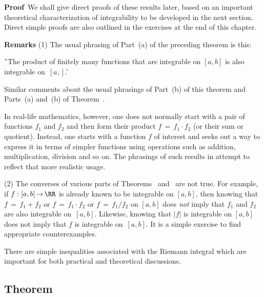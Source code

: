 \V


        {\bf Proof}\, We shall give direct proofs of these results later, based on an important theoretical characterization of integrability to be developed in the next section.
    Direct simple proofs are also outlined in the exercises at the end of this chapter. \Q %

\V

        {\bf Remarks} (1) The usual phrasing of Part~(a) of the preceding theorem is this:

\VA

        \h `The product of finitely many functions that are integrable on $[a,b]$ is also integrable on~$[a,]$.'

\VA

\noindent Similar comments about the usual phrasings of Part~(b) of this theorem and Parts~(a) and~(b) of Theorem~.

        In real-life mathematics, however, one does not normally start with a pair of functions $f_{1}$ and $f_{2}$ and then form their product $f \,=\, f_{1}{\cdot}f_{2}$ (or their sum or quotient).
    Instead, one starts with a function $f$ of interest and seeks out a way to express it in terms of simpler functions using operations such as addition,
    multiplication, division and so on. The phrasings of such results in {\ThisText} attempt to reflect that more realistic usage.

\V

        (2) The converses of various parts of Theorems~ and~ are not true.
    For example, if $f:[a,b] \,{\rightarrow}\, {\RR}$ is already known to be integrable on $[a,b]$, then knowing that $f \,=\, f_{1}+f_{2}$
    or $f \,=\, f_{1}{\cdot}f_{2}$ or $f \,=\, f_{1}/f_{2}$ on $[a,b]$ does {\em not} imply that $f_{1}$ and $f_{2}$ are also integrable on~$[a,b]$.
    Likewise, knowing that $|f|$ is integrable on $[a,b]$ does not imply that $f$ is integrable on~$[a,b]$.
    It is a simple exercise to find appropriate counterexamples. %

\VV

        There are simple inequalities associated with the Riemann integral which are important for both practical and theoretical discussions.

\V

        \subsection{\small{{\bf Theorem}}}
        \label{ThmH25.40}

